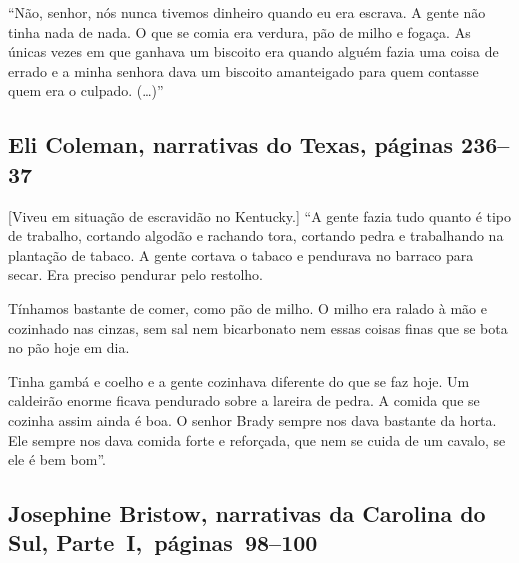 ``Não, senhor, nós nunca tivemos dinheiro quando eu era escrava. A gente
não tinha nada de nada. O que se comia era verdura, pão de milho e
fogaça. As únicas vezes em que ganhava um biscoito era quando alguém
fazia uma coisa de errado e a minha senhora dava um biscoito amanteigado
para quem contasse quem era o culpado. (\ldots{})''

\subsection{Eli Coleman, narrativas do Texas, páginas 236--37}

{[}Viveu em situação de escravidão no Kentucky.{]} ``A gente fazia tudo quanto é tipo de trabalho, cortando algodão e
rachando tora, cortando pedra e trabalhando na plantação de tabaco. A
gente cortava o tabaco e pendurava no barraco para secar. Era preciso
pendurar pelo restolho.

Tínhamos bastante de comer, como pão de milho. O milho era ralado à mão
e cozinhado nas cinzas, sem sal nem bicarbonato nem essas coisas finas
que se bota no pão hoje em dia.

Tinha gambá e coelho e a gente cozinhava diferente do que se faz hoje.
Um caldeirão enorme ficava pendurado sobre a lareira de pedra. A comida
que se cozinha assim ainda é boa. O senhor Brady sempre nos dava
bastante da horta. Ele sempre nos dava comida forte e reforçada, que nem
se cuida de um cavalo, se ele é bem bom''.

\subsection{Josephine Bristow, narrativas da Carolina do Sul, Parte~I,~páginas~98--100} \label{ref34}

